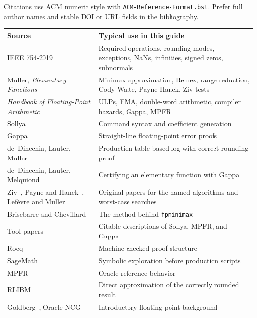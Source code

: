 \documentclass[manuscript, nonacm]{acmart}
\begin{document}
  Citations use ACM numeric style with \texttt{ACM-Reference-Format.bst}.
  Prefer full author names and stable DOI or URL fields in the bibliography.

  \begin{table}[tbp]
    \centering
    \begin{tabular}{p{5.0cm}p{6.4cm}}
      \toprule
      Source & Typical use in this guide                                        \\
      \midrule
      IEEE 754-2019~\cite{ieee}
      & Required operations, rounding modes, exceptions, NaNs, infinities,
      signed zeros, subnormals \\
      Muller, \emph{Elementary Functions}~\cite{muller}
      & Minimax approximation, Remez, range reduction, Cody-Waite,
      Payne-Hanek, Ziv tests \\
      \emph{Handbook of Floating-Point Arithmetic}~\cite{handbook}
      & ULPs, FMA, double-word arithmetic, compiler hazards, Gappa, MPFR \\
      Sollya~\cite{sollya}
      & Command syntax and coefficient generation \\
      Gappa~\cite{gappa}
      & Straight-line floating-point error proofs \\
      de~Dinechin, Lauter, Muller~\cite{dinechinlog}
      & Production table-based log with correct-rounding proof           \\
      de~Dinechin, Lauter, Melquiond~\cite{gappacert}
      & Certifying an elementary function with Gappa                     \\
      Ziv~\cite{ziv1991}, Payne and Hanek~\cite{payne1983},
      Lef\`evre and Muller~\cite{lefevre}
      & Original papers for the named algorithms and worst-case searches \\
      Brisebarre and Chevillard~\cite{brisebarre2007}
      & The method behind \texttt{fpminimax}                             \\
      Tool papers~\cite{sollyapaper,mpfrpaper,gappapaper}
      & Citable descriptions of Sollya, MPFR, and Gappa                  \\
      Rocq~\cite{rocq}
      & Machine-checked proof structure \\
      SageMath~\cite{sagemath}
      & Symbolic exploration before production scripts \\
      MPFR~\cite{mpfr}
      & Oracle reference behavior \\
      RLIBM~\cite{rlibm}
      & Direct approximation of the correctly rounded result \\
      Goldberg~\cite{goldberg}, Oracle NCG~\cite{oracle}
      & Introductory floating-point background \\
      \bottomrule
    \end{tabular}
  \end{table}
\end{document}

